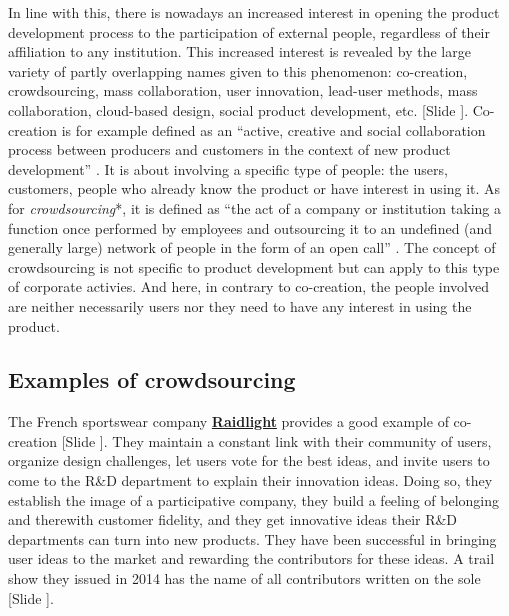 \documentclass{article}
\newcounter{slide}
\begin{document}
In line with this, there is nowadays an increased interest in opening the product development process to the participation of external people, regardless of their affiliation to any institution. This increased interest is revealed by the large variety of partly overlapping names given to this phenomenon: co-creation, crowdsourcing, mass collaboration, user innovation, lead-user methods, mass collaboration, cloud-based design, social product development, etc. {\color{blue}[Slide ]}. Co-creation is for example defined as an ``active, creative and social collaboration process between producers and customers in the context of new product development'' \cite{pillerSocialMediaSocial2011}. It is about involving a specific type of people: the users, customers, people who already know the product or have interest in using it. As for \emph{crowdsourcing}*, it is defined as ``the act of a company or institution taking a function once performed by employees and outsourcing it to an undefined (and generally large) network of people in the form of an open call'' \cite{howeCrowdsourcingDefinition2006}. The concept of crowdsourcing is not specific to product development but can apply to this type of corporate activies. And here, in contrary to co-creation, the people involved are neither necessarily users nor they need to have any interest in using the product. 

\subsection{Examples of crowdsourcing}
\label{sec:CSexamples}

The French sportswear company \textbf{\href{https://team.fr.raidlight.com/categories/atelier-de-conception-ouvert-a-tous.369/}{Raidlight}} provides a good example of co-creation {\color{blue} [Slide ]}. They maintain a constant link with their community of users, organize design challenges, let users vote for the best ideas, and invite users to come to the R\&D department to explain their innovation ideas. Doing so, they establish the image of a participative company, they build a feeling of belonging and therewith customer fidelity, and they get innovative ideas their R\&D departments can turn into new products. They have been successful in bringing user ideas to the market and rewarding the contributors for these ideas. A trail show they issued in 2014 has the name of all contributors written on the sole {\color{blue} [Slide ]}. 
\end{document}
